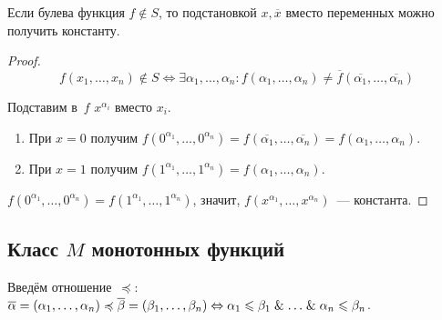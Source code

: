 \begin{lemma}
Если булева функция $f \notin S$, то подстановкой $x, \overline x$ вместо переменных можно получить константу.
\end{lemma}
\begin{proof}
\begin{equation*}
f(x_1, \ldots, x_n) \notin S \Leftrightarrow
\exists \alpha_1, \ldots, \alpha_n \colon
f(\alpha_1, \ldots, \alpha_n) \neq \overline f(\overline{\alpha_1}, \ldots, \overline{\alpha_n})
\end{equation*}

Подставим в~$f$ $x^{\alpha_i}$ вместо $x_i$.
\begin{enumerate}
	\item При $x = 0$ получим $f(0^{\alpha_1}, \ldots, 0^{\alpha_n}) =
	f(\overline{\alpha_1}, \ldots, \overline{\alpha_n}) =
	f(\alpha_1, \ldots, \alpha_n)$.
	
	\item При $x = 1$ получим $f(1^{\alpha_1}, \ldots, 1^{\alpha_n}) =
	f(\alpha_1, \ldots, \alpha_n)$.
\end{enumerate}

$f(0^{\alpha_1}, \ldots, 0^{\alpha_n}) = f(1^{\alpha_1}, \ldots, 1^{\alpha_n})$, значит, $f(x^{\alpha_1}, \ldots, x^{\alpha_n})$~--- константа.
\end{proof}

\subsection{Класс \texorpdfstring{$M$}{} монотонных функций}
Введём отношение~$\preccurlyeq$: $\overline\alpha = (\alpha_1, \ldots, \alpha_n) \preccurlyeq \overline\beta = (\beta_1, \ldots, \beta_n) \Leftrightarrow
\alpha_1 \leqslant \beta_1 \mathrel{\&} \ldots \mathrel{\&} \alpha_n \leqslant \beta_n$.


